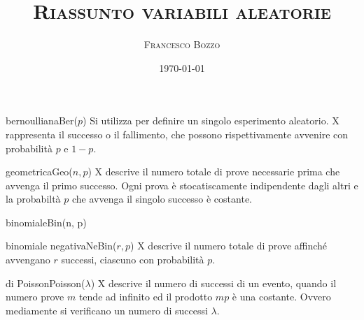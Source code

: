 \documentclass[
	,a4paper
	,12pt
	,oneside
]{article}
\title{\textsc{Riassunto variabili aleatorie}}
\author{\textsc{Francesco Bozzo}}
\date{\today}
\begin{document}
\maketitle

\begin{aleatoria}{bernoulliana}{Ber(\(p\))}
	Si utilizza per definire un singolo esperimento aleatorio. X rappresenta il successo o il fallimento, che possono rispettivamente avvenire con probabilità \(p\) e \(1-p\).
\end{aleatoria}

\begin{aleatoria}{geometrica}{Geo(\(n, p\))}
	X descrive il numero totale di prove necessarie prima che avvenga il primo successo. Ogni prova è stocatiscamente indipendente dagli altri e la probabiltà \(p\) che avvenga il singolo successo è costante.
\end{aleatoria}

\begin{aleatoria}{binomiale}{Bin(n, p)}
\end{aleatoria}

\begin{aleatoria}{binomiale negativa}{NeBin(\(r, p\))}
	X descrive il numero totale di prove affinché avvengano \(r\) successi, ciascuno con probabilità \(p\).
\end{aleatoria}

\begin{aleatoria}{di Poisson}{Poisson(\(\lambda\))}
	X descrive il numero di successi di un evento, quando il numero prove \(m\) tende ad infinito ed il prodotto \(mp\) è una costante. Ovvero mediamente si verificano un numero di successi \(\lambda\).
\end{aleatoria}
\end{document}
